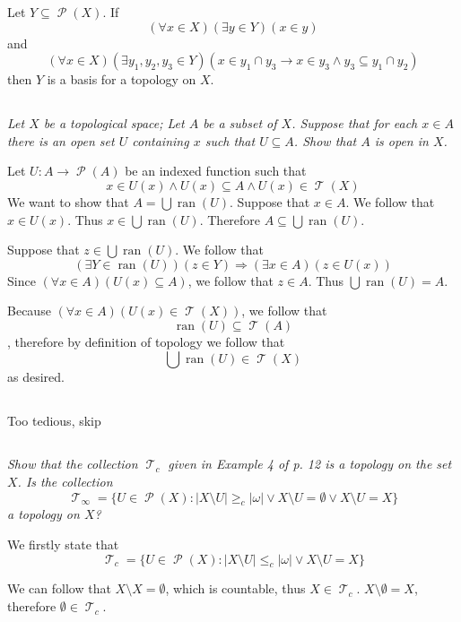 \documentclass[11pt,oneside,titlepage]{book}
\DeclareMathOperator \pow {\mathcal {P}}
\DeclareMathOperator \topol {\mathcal {T}}
\DeclareMathOperator \ra {\Rightarrow}
\DeclareMathOperator \ran {ran}
\begin{document}
Let $Y \subseteq \pow(X)$. If
$$(\forall x \in X)(\exists y \in Y)(x \in y)$$
and
$$(\forall x \in X)(\exists y_1, y_2, y_3 \in Y)(x \in y_1 \cap y_3 \to
x \in y_3 \land y_3 \subseteq y_1 \cap y_2)$$
then $Y$ is a basis for a topology on $X$.

\subsection{}

\textit{Let $X$ be a topological space; Let $A$ be a subset of $X$. Suppose that for each
  $x \in A$ there is an open set $U$ containing $x$ such that $U \subseteq A$. Show that $A$ is
  open in $X$.}

Let $U: A \to \pow(A)$ be an indexed function such that 
$$x \in U(x) \land U(x) \subseteq A \land U(x) \in \topol(X)$$
We want to show that $A = \bigcup{\ran(U)}$. Suppose that $x \in A$. We follow that
$x \in U(x)$. Thus $x \in \bigcup{\ran(U)}$. Therefore $A \subseteq \bigcup{\ran(U)}$.

Suppose that $z \in \bigcup{\ran(U)}$. We follow that
$$(\exists Y \in \ran(U))(z \in Y) \ra
(\exists x \in A)(z \in U(x))$$
Since $(\forall x \in A)(U(x) \subseteq A)$, we follow that $z \in A$. Thus
$\bigcup{\ran(U)} = A$.

Because $(\forall x \in A)(U(x) \in \topol(X))$, we follow that
$$\ran(U) \subseteq \topol(A)$$, therefore by definition of topology we follow that
$$\bigcup{\ran(U)} \in \topol(X)$$
as desired.

\subsection{}

Too tedious, skip

\subsection{}

\textit{Show that the collection $\topol_c$ given in Example 4 of p. 12 is a topology on the
  set $X$. Is the collection
  $$\topol_\infty = \{U \in \pow(X):
  |X \setminus U| \geq_c |\omega| \lor X \setminus U = \emptyset \lor
  X \setminus U = X\}$$
  a topology on $X$?
}

We firstly state that
$$\topol_c = \{U \in \pow(X): |X \setminus U| \leq_c |\omega| \lor X \setminus U = X\}$$

We can follow that $X \setminus X = \emptyset$, which is countable, thus $X \in \topol_c$.
$X \setminus \emptyset = X$, therefore $\emptyset \in \topol_c$.
\end{document}

